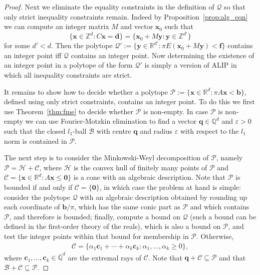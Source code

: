 \documentclass[format=acmsmall, review=false, screen=true]{acmart}
\newcommand{\Reals}{\mathbb{R}}
\newcommand{\Rationals}{\mathbb{Q}}
\newcommand{\Algebraics}{\overline{\Rationals}}
\newcommand{\myvector}{\boldsymbol}
\begin{document}
\begin{proof}
Next we eliminate the equality constraints in the definition of
$\mathcal{Q}$ so that only strict inequality constraints remain.
Indeed by Proposition~\ref{prop:alg_eqn} we can compute an integer matrix $M$ and
vector $\myvector{x}_0$ such that
\[ \{ \myvector{x} \in \mathbb{Z}^d : C\myvector{x}=\myvector{d} \} =
   \{ \myvector{x}_0 + M\myvector{y} : \myvector{y} \in
   \mathbb{Z}^{d'} \} \] for some $d' < d$.  Then the polytope
   $\mathcal{Q}' := \{ \myvector{y} \in \mathbb{R}^{d'} : \pi
   E(\myvector{x}_0 + M\myvector{y}) < \boldsymbol{f}\}$ contains an
   integer point iff $\mathcal{Q}$ contains an integer point.  Now
   determining the existence of an integer point in a polytope of the
   form $\mathcal{Q}'$ is simply a version of ALIP in which all
   inequality constraints are strict.

It remains to show how to decide whether a polytope $\mathcal{P} :=
\lbrace \myvector{x} \in \Reals^{d}: \pi A \myvector{x} < \myvector{b}
\rbrace$, defined using only strict constraints, contains an integer
point.  To do this we first use Theorem~\ref{thm:fme} to decide
whether $\mathcal{P}$ is non-empty.  In case $\mathcal{P}$ is
non-empty we can use Fourier-Motzkin elimination to find a vector
$\myvector{q} \in \Rationals^{d}$ and $\varepsilon > 0$ such that the
closed $l_1$-ball $\mathcal{B}$ with centre $\myvector{q}$ and radius
$\varepsilon$ with respect to the $l_{1}$ norm is contained in
$\mathcal{P}$.

The next step is to consider the Minkowski-Weyl decomposition of
$\mathcal{P}$, namely $\mathcal{P} = \mathcal{H} + \mathcal{C}$, where
$\mathcal{H}$ is the convex hull of finitely many points of
$\mathcal{P}$ and $\mathcal{C} = \lbrace
\myvector{x} \in \Reals^{d}: A \myvector{x} \leq \myvector{0} \rbrace$
is a cone with an algebraic description.  Note that $\mathcal{P}$ is
bounded if and only if $\mathcal{C} = \lbrace \myvector{0} \rbrace$,
in which case the problem at hand is simple: consider the polytope
$\mathcal{Q}$ with an algebraic description obtained by rounding up
each coordinate of $\myvector{b} / \pi$, which has the same conic part
as $\mathcal{P}$ and which contains $\mathcal{P}$, and therefore is
bounded; finally, compute a bound on $\mathcal{Q}$ (such a bound can
be defined in the first-order theory of the reals), which is also a
bound on $\mathcal{P}$, and test the integer points within that bound
for membership in $\mathcal{P}$. Otherwise,
\begin{align*}
\mathcal{C} = \lbrace \alpha_{1} \myvector{c}_{1} + \cdots + \alpha_{k} \myvector{c}_{k}: \alpha_{1}, \ldots, \alpha_{k} \geq 0 \rbrace,
\end{align*}
where $\myvector{c}_{1}, \ldots, \myvector{c}_{k} \in \Algebraics^{d}$ are the extremal rays of $\mathcal{C}$. Note that $\myvector{q} + \mathcal{C} \subseteq \mathcal{P}$ and that $\mathcal{B} + \mathcal{C} \subseteq \mathcal{P}$.


\end{proof}
\end{document}
